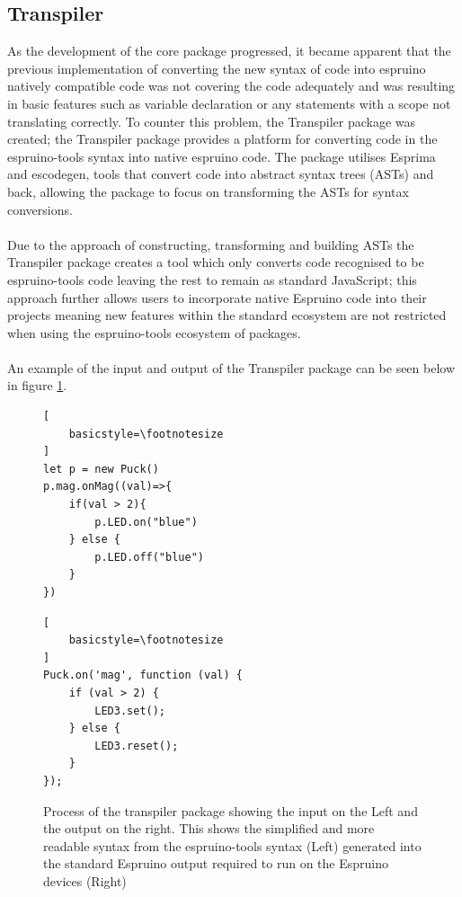 \documentclass{l4proj}
\begin{document}
\subsection{Transpiler}
As the development of the core package progressed, it became apparent that the previous implementation of converting the new syntax of code into espruino natively compatible code was not covering the code adequately and was resulting in basic features such as variable declaration or any statements with a scope not translating correctly. To counter this problem, the Transpiler package was created; the Transpiler package provides a platform for converting code in the espruino-tools syntax into native espruino code. The package utilises Esprima and escodegen, tools that convert code into abstract syntax trees (ASTs) and back, allowing the package to focus on transforming the ASTs for syntax conversions.
\\ \\
Due to the approach of constructing, transforming and building ASTs the Transpiler package creates a tool which only converts code recognised to be espruino-tools code leaving the rest to remain as standard JavaScript; this approach further allows users to incorporate native Espruino code into their projects meaning new features within the standard ecosystem are not restricted when using the espruino-tools ecosystem of packages.
\\ \\ 
An example of the input and output of the Transpiler package can be seen below in figure \ref{fig:transpiler-input-output}.

\begin{figure}[!ht]
\centering
\begin{minipage}{6cm}
  \centering
  \begin{lstlisting}[
    basicstyle=\footnotesize
]
let p = new Puck()
p.mag.onMag((val)=>{
    if(val > 2){
        p.LED.on("blue")
    } else {
        p.LED.off("blue")
    }
})

  \end{lstlisting}
\end{minipage}
\hspace{0.5cm}
\begin{minipage}{6cm}
  \centering
  
  \begin{lstlisting}[
    basicstyle=\footnotesize
]
Puck.on('mag', function (val) {
    if (val > 2) {
        LED3.set();
    } else {
        LED3.reset();
    }
});
  \end{lstlisting}
\end{minipage}


  \caption{Process of the transpiler package showing the input on the Left and the output on the right. This shows the simplified and more readable syntax from the espruino-tools syntax (Left) generated into the standard Espruino output required to run on the Espruino devices (Right)}
  \label{fig:transpiler-input-output}

\end{figure}
\end{document}
